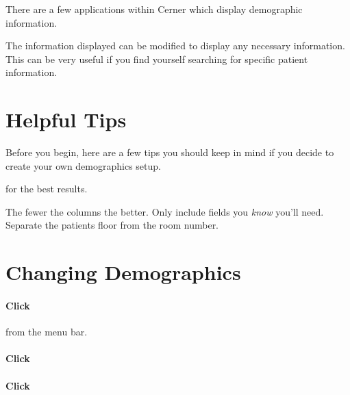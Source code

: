 There are a few applications within Cerner which display demographic information.

The information displayed can be modified to display any necessary information. This can be very useful if you find yourself searching for specific patient information.\\



\section{Helpful Tips}
Before you begin, here are a few tips you should keep in mind if you decide to create your own demographics setup.

 for the best results.
\begin{itemize}
     The fewer the columns the better.
     Only include fields you \textit{know} you'll need.
     Separate the patients floor from the room number.
\end{itemize}


\section{Changing Demographics}

\paragraph{Click}  from the menu bar.\\


\paragraph{Click} 

\paragraph{Click} \\


